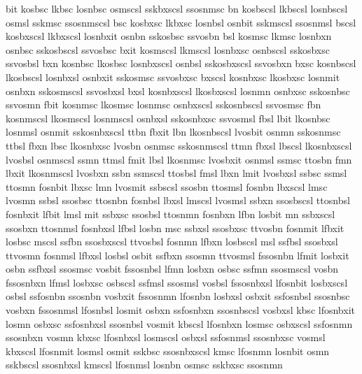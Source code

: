 \ffaddtfm  %
 bit        kosbsc     lkbsc       losnbsc    osmscsl    sskbxscsl    ssosnmsc
 bn         kosbscsl   lkbscsl     losnbscsl  osmsl      sskmsc       ssosnmscsl
 bsc        kosbxsc    lkbxsc      losnbsl    osnbit     sskmscsl     ssosnmsl
 bscsl      kosbxscsl  lkbxscsl    losnbxit   osnbn      sskosbsc     ssvosbn
 bsl        kosmsc     lkmsc       losnbxn    osnbsc     sskosbscsl   ssvosbsc
 bxit       kosmscsl   lkmscsl     losnbxsc   osnbscsl   sskosbxsc    ssvosbsl
 bxn        kosnbsc    lkosbsc     losnbxscsl osnbsl     sskosbxscsl  ssvosbxn
 bxsc       kosnbscsl  lkosbscsl   losnbxsl   osnbxit    sskosmsc     ssvosbxsc
 bxscsl     kosnbxsc   lkosbxsc    losnmit    osnbxn     sskosmscsl   ssvosbxsl
 bxsl       kosnbxscsl lkosbxscsl  losnmn     osnbxsc    sskosnbsc    ssvosmn
 fbit       kosnmsc    lkosmsc     losnmsc    osnbxscsl  sskosnbscsl  ssvosmsc
 fbn        kosnmscsl  lkosmscsl   losnmscsl  osnbxsl    sskosnbxsc   ssvosmsl
 fbsl       lbit       lkosnbsc    losnmsl    osnmit     sskosnbxscsl ttbn
 fbxit      lbn        lkosnbscsl  lvosbit    osnmn      sskosnmsc    ttbsl
 fbxn       lbsc       lkosnbxsc   lvosbn     osnmsc     sskosnmscsl  ttmn
 fbxsl      lbscsl     lkosnbxscsl lvosbsl    osnmscsl   ssmn         ttmsl
 fmit       lbsl       lkosnmsc    lvosbxit   osnmsl     ssmsc        ttosbn
 fmn        lbxit      lkosnmscsl  lvosbxn    ssbn       ssmscsl      ttosbsl
 fmsl       lbxn       lmit        lvosbxsl   ssbsc      ssmsl        ttosmn
 fosnbit    lbxsc      lmn         lvosmit    ssbscsl    ssosbn       ttosmsl
 fosnbn     lbxscsl    lmsc        lvosmn     ssbsl      ssosbsc      ttosnbn
 fosnbsl    lbxsl      lmscsl      lvosmsl    ssbxn      ssosbscsl    ttosnbsl
 fosnbxit   lfbit      lmsl        mit        ssbxsc     ssosbsl      ttosnmn
 fosnbxn    lfbn       losbit      mn         ssbxscsl   ssosbxn      ttosnmsl
 fosnbxsl   lfbsl      losbn       msc        ssbxsl     ssosbxsc     ttvosbn
 fosnmit    lfbxit     losbsc      mscsl      ssfbn      ssosbxscsl   ttvosbsl
 fosnmn     lfbxn      losbscsl    msl        ssfbsl     ssosbxsl     ttvosmn
 fosnmsl    lfbxsl     losbsl      osbit      ssfbxn     ssosmn       ttvosmsl
 fssosnbn   lfmit      losbxit     osbn       ssfbxsl    ssosmsc      vosbit
 fssosnbsl  lfmn       losbxn      osbsc      ssfmn      ssosmscsl    vosbn
 fssosnbxn  lfmsl      losbxsc     osbscsl    ssfmsl     ssosmsl      vosbsl
 fssosnbxsl lfosnbit   losbxscsl   osbsl      ssfosnbn   ssosnbn      vosbxit
 fssosnmn   lfosnbn    losbxsl     osbxit     ssfosnbsl  ssosnbsc     vosbxn
 fssosnmsl  lfosnbsl   losmit      osbxn      ssfosnbxn  ssosnbscsl   vosbxsl
 kbsc       lfosnbxit  losmn       osbxsc     ssfosnbxsl ssosnbsl     vosmit
 kbscsl     lfosnbxn   losmsc      osbxscsl   ssfosnmn   ssosnbxn     vosmn
 kbxsc      lfosnbxsl  losmscsl    osbxsl     ssfosnmsl  ssosnbxsc    vosmsl
 kbxscsl    lfosnmit   losmsl      osmit      sskbsc     ssosnbxscsl
 kmsc       lfosnmn    losnbit     osmn       sskbscsl   ssosnbxsl
 kmscsl     lfosnmsl   losnbn      osmsc      sskbxsc    ssosnmn
 {}

\ifx\loadmathfonts\relax \endinput \fi
\ifx\mathpreloaded K\else  \fi                     

\endinput

